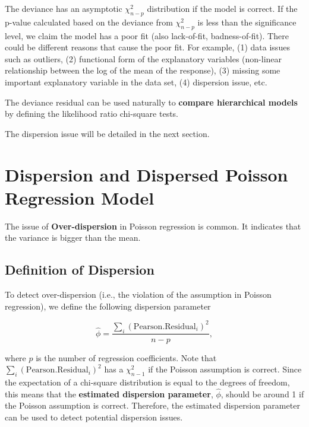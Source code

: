 \documentclass[
]{book}
\begin{document}
The deviance has an asymptotic \(\chi^2_{n-p}\) distribution if the model is correct. If the p-value calculated based on the deviance from \(\chi^2_{n-p}\) is less than the significance level, we claim the model has a poor fit (also lack-of-fit, badness-of-fit). There could be different reasons that cause the poor fit. For example, (1) data issues such as outliers, (2) functional form of the explanatory variables (non-linear relationship between the log of the mean of the response), (3) missing some important explanatory variable in the data set, (4) dispersion issue, etc.

The deviance residual can be used naturally to \textbf{compare hierarchical models} by defining the likelihood ratio chi-square tests.

The dispersion issue will be detailed in the next section.

\hfill\break

\hypertarget{dispersion-and-dispersed-poisson-regression-model}{%
\section{Dispersion and Dispersed Poisson Regression Model}\label{dispersion-and-dispersed-poisson-regression-model}}

The issue of \textbf{Over-dispersion} in Poisson regression is common. It indicates that the variance is bigger than the mean.

\hypertarget{definition-of-dispersion}{%
\subsection{Definition of Dispersion}\label{definition-of-dispersion}}

To detect over-dispersion (i.e., the violation of the assumption in Poisson regression), we define the following dispersion parameter

\[
\hat{\phi} = \frac{\sum_i(\text{Pearson.Residual}_i)^2}{n-p} ,
\]

where \(p\) is the number of regression coefficients. Note that \(\sum_i(\text{Pearson.Residual}_i)^2\) has a \(\chi_{n-1}^2\) if the Poisson assumption is correct. Since the expectation of a chi-square distribution is equal to the degrees of freedom, this means that the \textbf{estimated dispersion parameter}, \(\hat{\phi}\), should be around 1 if the Poisson assumption is correct. Therefore, the estimated dispersion parameter can be used to detect potential dispersion issues.
\end{document}
